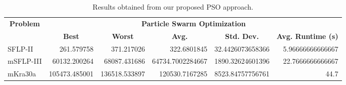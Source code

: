 \begin{table}[h!]
\begin{adjustwidth}{-1.18in}{}
\centering
\begin{tabular}{|l|r|r|r|r|r|} 
	\hline
	\multicolumn{1}{|c|}{\multirow{2}{*}{\textbf{Problem}}} & \multicolumn{5}{c|}{\textbf{Particle Swarm Optimization}}                                                                                                                                                 \\ 
	\cline{2-6}
	\multicolumn{1}{|c|}{}                                  & \multicolumn{1}{c|}{\textbf{Best}} & \multicolumn{1}{c|}{\textbf{Worst}} & \multicolumn{1}{c|}{\textbf{Avg.}} & \multicolumn{1}{c|}{\textbf{Std. Dev.}} & \multicolumn{1}{c|}{\textbf{Avg. Runtime (s)}}  \\ 
	\hline
	SFLP-II                                                 & 261.579758                         & 371.217026                          & 322.6801845                        & 32.4426073658366                        & 5.96666666666667                                \\ 
	\hline
	mSFLP-III                                               & 60132.200264                       & 68087.431686                        & 64734.7002284667                   & 1890.32624601396                        & 22.7666666666667                                \\ 
	\hline
	mKra30a                                                 & 105473.485001                      & 136518.533897                       & 120530.7167285                     & 8523.84757756761                        & 44.7                                            \\
	\hline
\end{tabular}
\end{adjustwidth}
\caption{Results obtained from our proposed PSO approach.}
\label{approach-pso-results}
\end{table}

